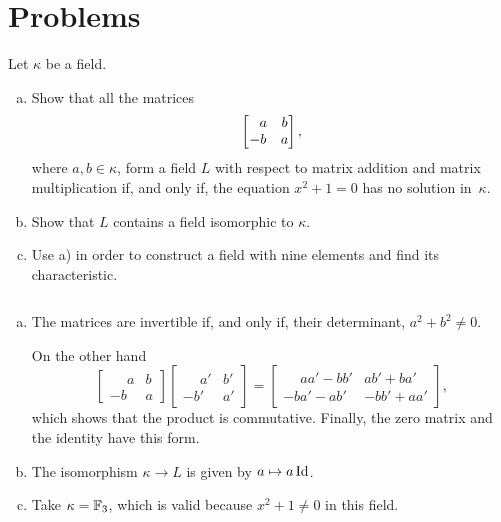 \section{Problems}

\begin{probl}
    Let\/ $\kappa$ be a field.
    \begin{enumerate}[a), font=\upshape]
        \item Show that all the matrices 
        $$
        \begin{bmatrix}
            \hphantom-a & b \\
            -b & a
        \end{bmatrix},
        $$
        where\/ $a, b \in \kappa$, form a field\/ $L$ with respect to matrix addition and matrix multiplication if, and only if, the equation\/ $x^2 + 1 = 0$ has no solution in\/~$\kappa$.
        
        \item Show that\/ $L$ contains a field isomorphic to\/ $\kappa$.
        
        \item Use\/ {\rm a)} in order to construct a field with nine elements and find its characteristic.
    \end{enumerate}
\end{probl}

\begin{solution}${}$
    \begin{enumerate}[a),font=\upshape]
        \item The matrices are invertible if, and only if, their determinant, $a^2+b^2\ne0$.

        On the other hand
        $$
            \begin{bmatrix}
                \phantom-a  &b\\
                -b &a
            \end{bmatrix}
            \begin{bmatrix}
                \phantom-a'  &b'\\
                -b'  &a'
            \end{bmatrix}
            =
            \begin{bmatrix}
                \phantom-aa'-bb'  
                    &ab'+ba'\\
                -ba'-ab'  &-bb'+aa'
            \end{bmatrix},
        $$
        which shows that the product is commutative. Finally, the zero matrix and the identity have this form.

        \item The isomorphism $\kappa\to L$ is given by $a\mapsto a\operatorname{Id}$.

        \item Take $\kappa=\mathbb F_3$, which is valid because $x^2+1\ne0$ in this field.
    \end{enumerate}
\end{solution}

